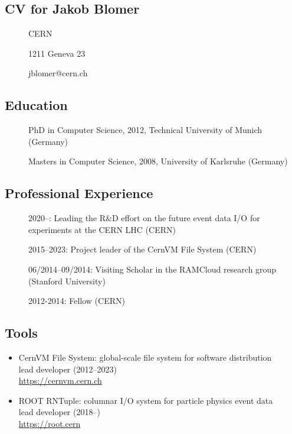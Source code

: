 
\subsection{CV for Jakob Blomer}
\begin{description}
\item[] CERN
\item[] 1211 Geneva 23
\item[] jblomer@cern.ch
\end{description}

\subsection*{Education}
\begin{description}
    \item[] PhD in Computer Science, 2012, Technical University of Munich (Germany)
    \item[] Masters in Computer Science, 2008, University of Karlsruhe (Germany)
\end{description}

\subsection*{Professional Experience}
\begin{description}
    \item[] 2020--: Leading the R\&D effort on the future event data I/O for experiments at the CERN LHC (CERN)
    \item[] 2015--2023: Project leader of the CernVM File System (CERN)
    \item[] 06/2014--09/2014: Visiting Scholar in the RAMCloud research group (Stanford University)
    \item[] 2012-2014: Fellow (CERN)
\end{description}

\subsection*{Tools}

\begin{itemize}
    \item[] CernVM File System: global-scale file system for software distribution
    \\lead developer (2012--2023)
    \\{\small{\url{https://cernvm.cern.ch}}}
    \item[] ROOT RNTuple: columnar I/O system for particle physics event data\\lead developer (2018--)\\{\small{\url{https://root.cern}}}
\end{itemize}

